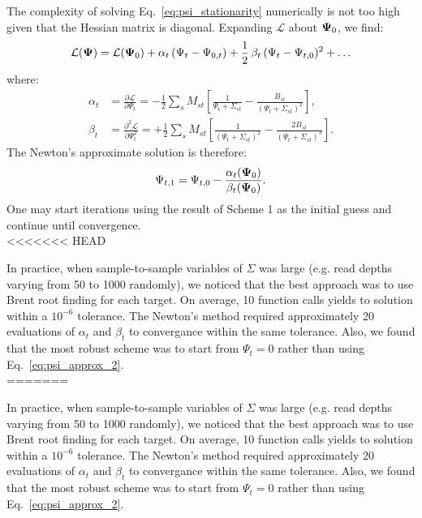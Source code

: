 \documentclass[nofootinbib,amssymb,amsmath]{revtex4}
\newcommand{\vPsi}{{\bf \Psi}}
\begin{document}
 The complexity of solving Eq.~\eqref{eq:psi_stationarity} numerically is not too high given that the Hessian matrix is diagonal. Expanding $\mathcal{L}$ about $\vPsi_0$, we find:
\begin{equation}
\mathcal{L}(\vPsi) = \mathcal{L}(\vPsi_0) + \alpha_t \, (\Psi_t - \Psi_{0,t}) + \frac{1}{2} \, \beta_t \, (\Psi_t - \Psi_{t,0})^2 + \ldots
\end{equation}
where:
\begin{align}
\alpha_t &= \frac{\partial \mathcal{L}}{\partial \Psi_t} = -\frac{1}{2}\sum_s M_{st}\left[\frac{1}{\Psi_t + \Sigma_{st}} - \frac{B_{st}}{(\Psi_t + \Sigma_{st})^2}\right],\nonumber\\
\beta_t &= \frac{\partial^2 \mathcal{L}}{\partial \Psi_t^2} = +\frac{1}{2}\sum_s M_{st}\left[\frac{1}{(\Psi_t + \Sigma_{st})^2} - \frac{2B_{st}}{(\Psi_t + \Sigma_{st})^3}\right].
\end{align}
The Newton's approximate solution is therefore:
\begin{equation}
\Psi_{t,1} = \Psi_{t,0} - \frac{\alpha_t(\vPsi_0)}{\beta_t(\vPsi_0)}.
\end{equation}
One may start iterations using the result of Scheme 1 as the initial guess and continue until convergence.\\
<<<<<<< HEAD

 In practice, when sample-to-sample variables of $\Sigma$ was large (e.g. read depths varying from 50 to 1000 randomly), we noticed that the best approach was to use Brent root finding for each target. On average, 10 function calls yields to solution within a $10^{-6}$ tolerance. The Newton's method required approximately 20 evaluations of $\alpha_t$ and $\beta_t$ to convergance within the same tolerance. Also, we found that the most robust scheme was to start from $\Psi_t = 0$ rather than using Eq.~\eqref{eq:psi_approx_2}.\\

=======

 In practice, when sample-to-sample variables of $\Sigma$ was large (e.g. read depths varying from 50 to 1000 randomly), we noticed that the best approach was to use Brent root finding for each target. On average, 10 function calls yields to solution within a $10^{-6}$ tolerance. The Newton's method required approximately 20 evaluations of $\alpha_t$ and $\beta_t$ to convergance within the same tolerance. Also, we found that the most robust scheme was to start from $\Psi_t = 0$ rather than using Eq.~\eqref{eq:psi_approx_2}.\\
\end{document}
